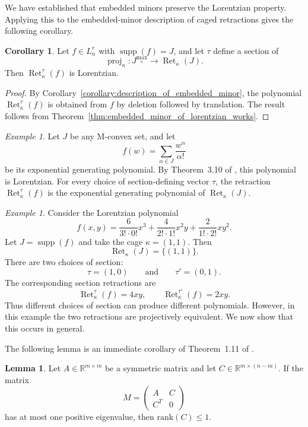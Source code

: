 \documentclass[11pt]{article}
\theoremstyle{definition}
\newtheorem{lemma}[theorem]{Lemma}
\newtheorem{corollary}[theorem]{Corollary}
\theoremstyle{remark}
\newtheorem{example}[theorem]{Example}
\newcommand{\R}{\mathbb{R}}
\DeclareMathOperator{\supp}{supp}
\newcommand{\Lnr}{L_n^r}
\DeclareMathOperator{\proj}{proj}              %
\newcommand{\kproj}{\proj_{\kappa}}            %
\DeclareMathOperator{\Ret}{Ret}                %
\newcommand{\RetK}{\Ret_{\kappa}}              %
\newcommand{\Jmax}{J^{\max_{\kappa}}}
\begin{document}
We have established that embedded minors preserve the Lorentzian property. Applying this to the embedded-minor description of caged retractions gives the following corollary.

\begin{corollary}\label{cor:section_retraction_lorentzian}
    Let $f\in\Lnr$ with $\supp(f)=J$, and let $\tau$ define a section of
    \[
        \kproj\colon \Jmax\to\RetK(J).
    \]
    Then $\RetK^\tau(f)$ is Lorentzian.
\end{corollary}

\begin{proof}
    By Corollary~\ref{corollary:description_of_embedded_minor}, the polynomial $\RetK^\tau(f)$ is obtained from $f$ by deletion followed by translation. The result follows from Theorem~\ref{thm:embedded_minor_of_lorentzian_works}.
\end{proof}

\begin{example}
    Let $J$ be any M-convex set, and let
    \[
        f(w)=\sum_{\alpha\in J}\frac{w^\alpha}{\alpha!}
    \]
    be its exponential generating polynomial. By Theorem~3.10 of \cite{branden2024lorentzianpolynomials}, this polynomial is Lorentzian. For every choice of section-defining vector $\tau$, the retraction $\RetK^\tau(f)$ is the exponential generating polynomial of $\RetK(J)$.
\end{example}

\begin{example}
    Consider the Lorentzian polynomial
    \[
        f(x,y)=\frac{6}{3!\cdot 0!}x^3+\frac{4}{2!\cdot 1!}x^2y+\frac{2}{1!\cdot 2!}xy^2.
    \]
    Let $J=\supp(f)$ and take the cage $\kappa=(1,1)$. Then
    \[
        \RetK(J)=\{(1,1)\}.
    \]
    There are two choices of section:
    \[
        \tau=(1,0)
        \qquad\text{and}\qquad
        \tau'=(0,1).
    \]
    The corresponding section retractions are
    \[
        \RetK^\tau(f)=4xy,
        \qquad
        \RetK^{\tau'}(f)=2xy.
    \]
    Thus different choices of section can produce different polynomials. However, in this example the two retractions are projectively equivalent. We now show that this occurs in general.
\end{example}

The following lemma is an immediate corollary of Theorem~1.11 of \cite{zhangSchurComplementIts2005}.

\begin{lemma}\label{lemma:1_pos_eigval_gives_rk1}
    Let $A\in\R^{m\times m}$ be a symmetric matrix and let $C\in\R^{m\times(n-m)}$. If the matrix
    \[
        M=
        \begin{pmatrix}
            A & C \\
            C^T & 0
        \end{pmatrix}
    \]
    has at most one positive eigenvalue, then $\mathrm{rank}(C)\leq 1$.
\end{lemma}
\end{document}
